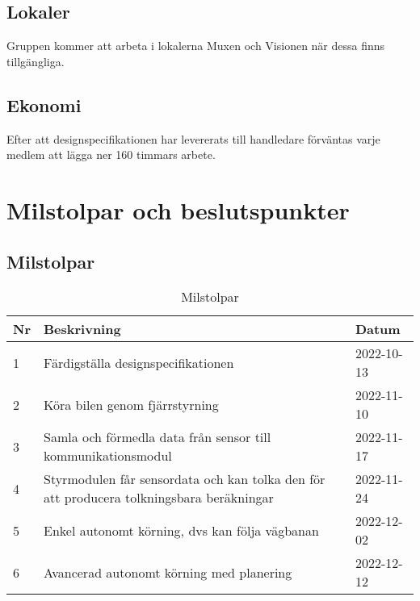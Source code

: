\documentclass[10pt,oneside,swedish]{lips}
\begin{document}
\subsection{Lokaler}
Gruppen kommer att arbeta i lokalerna Muxen och Visionen när dessa finns tillgängliga.

\subsection{Ekonomi}
Efter att designspecifikationen har levererats till handledare förväntas varje medlem att lägga ner 160 timmars arbete. 

\section{Milstolpar och beslutspunkter}


\subsection{Milstolpar}

\begin{table}[htbp]
  \centering
  \caption{Milstolpar}
  \label{tab:milstolar}
  \begin{tabular}{|l|p{80mm}|l|}
    \hline
      {\bfseries Nr} & 
      {\bfseries Beskrivning} & 
      {\bfseries Datum}  \\
      \hline
      \hline
      1 & Färdigställa designspecifikationen & 2022-10-13 \\
      \hline
      2 & Köra bilen genom fjärrstyrning & 2022-11-10 \\
      \hline
      3 & Samla och förmedla data från sensor till kommunikationsmodul & 2022-11-17 \\
      \hline
      4 & Styrmodulen får sensordata och kan tolka den för att producera tolkningsbara beräkningar & 2022-11-24 \\
      \hline
      5 & Enkel autonomt körning, dvs kan följa vägbanan & 2022-12-02 \\
      \hline
      6 & Avancerad autonomt körning med planering & 2022-12-12 \\
      \hline
    \end{tabular}
\end{table}
\end{document}
